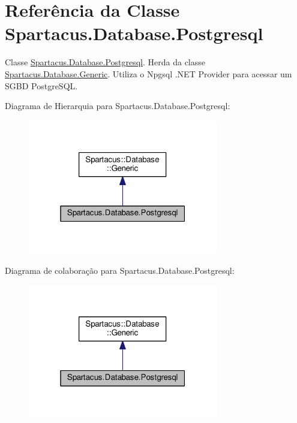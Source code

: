 \hypertarget{classSpartacus_1_1Database_1_1Postgresql}{\section{Referência da Classe Spartacus.\+Database.\+Postgresql}
\label{classSpartacus_1_1Database_1_1Postgresql}
}


Classe \hyperlink{classSpartacus_1_1Database_1_1Postgresql}{Spartacus.\+Database.\+Postgresql}. Herda da classe \hyperlink{classSpartacus_1_1Database_1_1Generic}{Spartacus.\+Database.\+Generic}. Utiliza o Npgsql .N\+E\+T Provider para acessar um S\+G\+B\+D Postgre\+S\+Q\+L.  




Diagrama de Hierarquia para Spartacus.\+Database.\+Postgresql\+:\nopagebreak
\begin{figure}[H]
\begin{center}
\leavevmode
\includegraphics[width=235pt]{classSpartacus_1_1Database_1_1Postgresql__inherit__graph}
\end{center}
\end{figure}


Diagrama de colaboração para Spartacus.\+Database.\+Postgresql\+:\nopagebreak
\begin{figure}[H]
\begin{center}
\leavevmode
\includegraphics[width=235pt]{classSpartacus_1_1Database_1_1Postgresql__coll__graph}
\end{center}
\end{figure}
